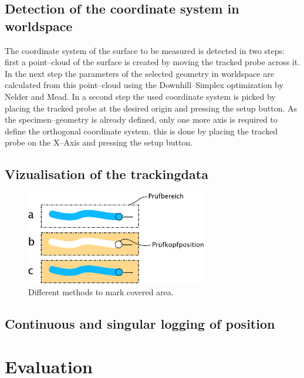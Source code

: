 \documentclass{VRARWorkshop}
\begin{document}
\subsection{Detection of the coordinate system in worldspace}
The coordinate system of the surface to be measured is detected in two steps:
first a point--cloud of the surface is created by moving the tracked probe across it.
In the next step the parameters of the selected geometry in worldspace are calculated from this point--cloud using the Downhill--Simplex optimization by Nelder and Mead.
In a second step the used coordinate system is picked by placing the tracked probe at the desired origin and pressing the setup button.
As the specimen--geometry is already defined, only one more axis is required to define the orthogonal coordinate system.
this is done by placing the tracked probe on the X--Axis and pressing the setup button.

\subsection{Vizualisation of the trackingdata}

\begin{figure}[h!]
    \begin{center}
        \includegraphics[width=79mm]{images/DrawVsErase.eps}
        \caption{\label{fig:DrawVsErase} Different methods to mark covered area.}
    \end{center}
\end{figure}

\subsection{Continuous and singular logging of position}

\section{Evaluation}
\end{document}

